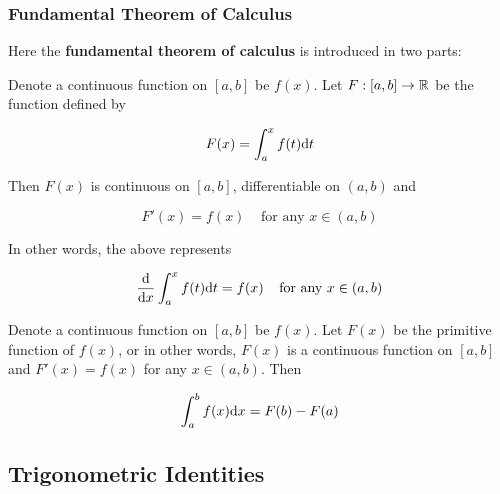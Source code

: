 \documentclass[a4paper,12pt]{article}
\begin{document}
\subsubsection{Fundamental Theorem of Calculus}
\begin{thm}
  Here the \textbf{fundamental theorem of calculus} is introduced in two parts:

  \begin{alist}
    \item Denote a continuous function on $[a,b]$ be $f(x)$. Let $F:[a,b]\to\mathbb{R}$ be the function defined by

    $$F(x)=\int_{a}^{x}f(t)\mathrm{d} t$$\s

    Then $F(x)$ is continuous on $[a,b]$, differentiable on $(a,b)$ and

    $$F'(x)=f(x)\;\;\;\;\text{for any }x\in(a,b)$$\s

    In other words, the above represents

    $$\frac{\mathrm{d} }{\mathrm{d}  x}\int_{a}^{x}f(t)\mathrm{d} t=f(x)\;\;\;\;\text{for any }x\in(a,b)$$

    \item Denote a continuous function on $[a,b]$ be $f(x)$. Let $F(x)$ be the primitive function of $f(x)$, or in other words, $F(x)$ is a continuous function on $[a,b]$ and $F'(x)=f(x)$ for any $x\in(a,b)$. Then

    $$\int_{a}^{b}f(x)\mathrm{d} x=F(b)-F(a)$$
  \end{alist}
\end{thm}

\subsection{Trigonometric Identities}
\end{document}
